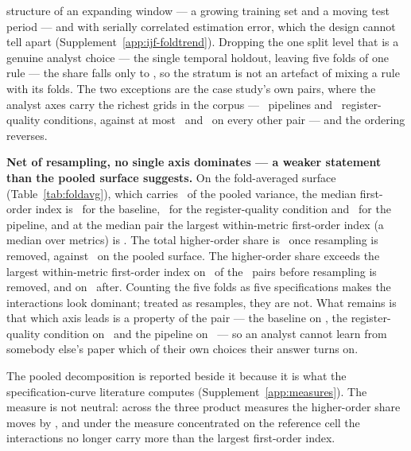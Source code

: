 structure of an expanding window --- a growing training set and a moving test
period --- and with serially correlated estimation error, which the design
cannot tell apart (Supplement~\ref{app:ijf-foldtrend}). Dropping
the one split level that is a genuine analyst choice --- the single temporal
holdout, leaving five folds of one rule --- the share falls only to
\shareResamplingRollingPct, so the stratum is not an artefact of mixing a
rule with its folds. The two exceptions are the case study's own pairs, where
the analyst axes carry the richest grids in the corpus ---
\nPipelineLevelsCase\ pipelines and \nQualityFigOne\ register-quality
conditions, against at most \nPipelineLevelsLarge\ and \nQualityLevelsOther\
on every other pair --- and the ordering reverses.

\textbf{Net of resampling, no single axis dominates --- a weaker statement
than the pooled surface suggests.} On the fold-averaged surface
(Table~\ref{tab:foldavg}), which carries \foldVarRatioPct\ of the pooled
variance, the median first-order index is \foldSRungPct\ for the baseline,
\foldSQualityPct\ for the register-quality condition and \foldSPipelinePct\
for the pipeline, and at the median pair the largest within-metric
first-order index (a median over metrics) is \foldLargestFirstOrderPct. The total higher-order share
is \foldInteractionTotalPct\ once resampling is removed, against
\pooledInteractionMedianPct\ on the pooled surface. The higher-order share
exceeds the largest within-metric first-order index on
\nPooledInteractionExceeds\ of the \nPairs\ pairs before resampling is
removed, and on \nFoldInteractionExceeds\ after. Counting the five
folds as five specifications makes the interactions look dominant; treated as
resamples, they are not. What remains is that which axis leads is
a property of the pair --- the baseline on \nFoldLeadPairsRung, the
register-quality condition on \nFoldLeadPairsQuality\ and the pipeline on
\nFoldLeadPairsPipeline\ --- so an analyst cannot learn from somebody else's
paper which of their own choices their answer turns on.

The pooled decomposition is reported beside it because it is what the
specification-curve literature computes (Supplement~\ref{app:measures}). The
measure is not neutral: across the three product measures the higher-order
share moves by \measureSpreadPts, and under the measure concentrated on the
reference cell the interactions no longer carry more than the largest
first-order index.


